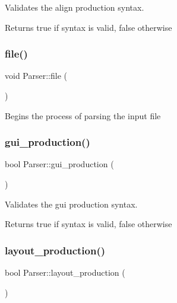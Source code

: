 Validates the align production syntax. \begin{DoxyReturn}{Returns}
true if syntax is valid, false otherwise 
\end{DoxyReturn}
\hypertarget{class_parser_aa419c434b0e0def8c101bf906928a5ba}{}\label{class_parser_aa419c434b0e0def8c101bf906928a5ba} 
\subsubsection{\texorpdfstring{file()}{file()}}
{\footnotesize\ttfamily void Parser\+::file (\begin{DoxyParamCaption}{ }\end{DoxyParamCaption})}

Begins the process of parsing the input file \hypertarget{class_parser_aa1ca665de0b8bb360a8bb084c4044861}{}\label{class_parser_aa1ca665de0b8bb360a8bb084c4044861} 
\subsubsection{\texorpdfstring{gui\+\_\+production()}{gui\_production()}}
{\footnotesize\ttfamily bool Parser\+::gui\+\_\+production (\begin{DoxyParamCaption}{ }\end{DoxyParamCaption})\hspace{0.3cm}{\ttfamily [private]}}

Validates the gui production syntax. \begin{DoxyReturn}{Returns}
true if syntax is valid, false otherwise 
\end{DoxyReturn}
\hypertarget{class_parser_a5edcbcd8826520596b79dae93096425d}{}\label{class_parser_a5edcbcd8826520596b79dae93096425d} 
\subsubsection{\texorpdfstring{layout\+\_\+production()}{layout\_production()}}
{\footnotesize\ttfamily bool Parser\+::layout\+\_\+production (\begin{DoxyParamCaption}{ }\end{DoxyParamCaption})\hspace{0.3cm}{\ttfamily [private]}}


